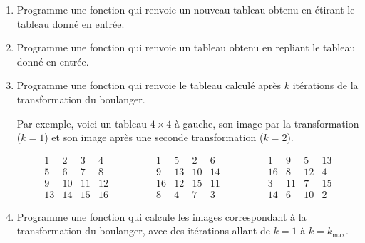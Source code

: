 \documentclass[11pt,class=report,crop=false]{standalone}
\begin{document}
\begin{activite}



\begin{enumerate}
  \item Programme une fonction  qui renvoie un nouveau tableau obtenu en \og{}étirant\fg{} le tableau donné en entrée.



    \item Programme une fonction  qui renvoie un  tableau obtenu en \og{}repliant\fg{} le tableau donné en entrée.
  
  
   \item Programme une fonction  qui renvoie le tableau calculé après $k$ itérations de la transformation du boulanger.
  
  Par exemple, voici un tableau $4 \times 4$ à gauche, son image par la transformation ($k=1$) et son image après une seconde transformation ($k=2$).
  
 $$\begin{array}{cccc} 
  1& 2& 3& 4\\ 
  5& 6& 7& 8\\  
  9&10&11&12\\  
 13&14&15&16  
\end{array}\qquad\qquad  
 \begin{array}{cccc} 
  1& 5& 2& 6\\ 
  9& 13& 10& 14\\  
  16&12&15&11\\  
  8&4&7&3  
\end{array}\qquad\qquad  
 \begin{array}{cccc} 
   1&    9&    5&   13 \\ 
 16&    8&   12&    4\\  
  3&   11&    7&   15\\  
 14&    6&   10&    2
\end{array}
$$ 
  \item Programme une fonction  qui calcule 
  les images correspondant à la transformation du boulanger, avec des itérations allant de $k=1$ à $k=k_{\max}$.
  

\end{enumerate}
\end{activite}
\end{document}
